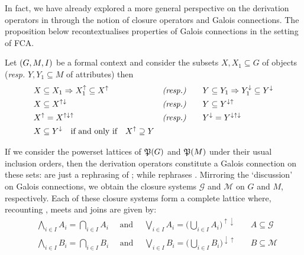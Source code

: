 In fact, we have already explored a more general perspective on the derivation operators in 
through the notion of closure operators and Galois connections. The proposition below recontextualises properties of
Galois connections in the setting of FCA.

\begin{proposition}
	\label{proposition:derivation-operators-galois} Let $(G,M,\mathrel{I})$ be a formal context and consider the subsets $X,X_{1}\subseteq
	G$ of objects (\textit{resp.} $Y,Y_{1}\subseteq M$ of attributes) then
	\begin{align}
		 & X \subseteq X_{1}\Rightarrow X_{1}^{\uparrow}\subseteq X^{\uparrow} & \textit{(resp.)}         & \qquad Y \subseteq Y_{1}\Rightarrow Y_{1}^{\downarrow}\subseteq Y^{\downarrow}\label{equation:galois-1} \\
		 & X \subseteq X^{\uparrow \downarrow}                                 & \textit{(resp.)}         & \qquad Y \subseteq Y^{\downarrow \uparrow}\label{equation:galois-2}                                     \\
		 & X^{\uparrow}= X^{\uparrow \downarrow \uparrow}                      & \textit{(resp.)}         & \qquad Y^{\downarrow}= Y^{\downarrow \uparrow \downarrow}\label{equation:galois-3}                      \\
		 & X \subseteq Y^{\downarrow}\quad \text{if and only if}\quad X^{\uparrow}\supseteq Y             & \label{equation:galois-4}
	\end{align}
\end{proposition}

If we consider the powerset lattices of $\mathfrak{P}({G})$ and $\mathfrak{P}({M})$ under their usual inclusion orders, then the
derivation operators constitute a Galois connection on these sets: 
are just a rephrasing of ; while
 rephrases . Mirroring the `discussion' on Galois connections,
we obtain the closure systems $\mathcal{G}$ and $\mathcal{M}$ on $G$ and $M$, respectively. Each of these closure
systems form a complete lattice where, recounting , meets and joins are given by:
%
\begin{align*}
	 & \underset{i \in I}\bigwedge A_{i}= \underset{i \in I}\bigcap A_{i}\quad \text{ and }\quad \underset{i \in I}\bigvee A_{i}= \big(\underset{i \in I}\bigcup A_{i}\big)^{\uparrow \downarrow} & \quad A\subseteq \mathcal{G} \\
	 & \underset{i \in I}\bigwedge B_{i}= \underset{i \in I}\bigcap B_{i}\quad \text{ and }\quad\underset{i \in I}\bigvee B_{i}= \big( \underset{i \in I}\bigcup B_{i}\big)^{\downarrow \uparrow} & \quad B\subseteq \mathcal{M}
\end{align*}

